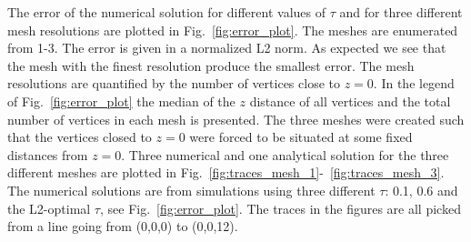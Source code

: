 
The error of the numerical solution for different values of $\tau$ and for three different mesh resolutions are plotted in Fig.~\ref{fig:error_plot}. The meshes are enumerated from 1-3. The error is given in a normalized L2 norm. As expected we see that the mesh with the finest resolution produce the smallest error. The mesh resolutions are quantified by the number of vertices close to $z=0$. In the legend of Fig.~\ref{fig:error_plot} the median of the $z$ distance of all vertices and the total number of vertices in each mesh is presented. The three meshes were created such that the vertices closed to $z=0$ were forced to be situated at some fixed distances from $z=0$. Three numerical and one analytical solution for the three different meshes are plotted in Fig.~\ref{fig:traces_mesh_1}-~\ref{fig:traces_mesh_3}. The numerical solutions are from simulations using three different $\tau$: 0.1, 0.6 and the L2-optimal $\tau$, see Fig.~\ref{fig:error_plot}. The traces in the figures are all picked from a line going from (0,0,0) to (0,0,12). \par

\newcommand{\captiontwo}{The figures shows the concentration traces of the numerical solutions from Mesh 2, see legend of Fig.~\ref{fig:error_plot}, for three different $\tau$ together with the analytic solution. The traces in the two panels were picked from a line going between the points (0,0,0) and (0,0,1.5) for the left panel and between (0,0,10.5) and (0,0,12) for the right panel. We see from both panels that the solution with $\tau=0.10$ give the poorest solution. The solution with $\tau=0.28$ was the solution with smallest global error for this mesh, see Fig~\ref{fig:error_plot}, and this is reflected in the reasonable good fit seen in the left panel, especially at $z=0$nm. The solution with $\tau=0.60$ undershoots the analytic solution at $z=0$ with \~1.2 $\mu$M. From the right panel we see that all numerical solutions undershoot at $z=15$nm, and that the trace with $\tau=0.60$ comes closest the analytic solution.}

